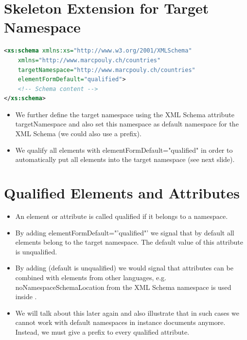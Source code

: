 \section{Skeleton Extension for Target Namespace}
\begin{lstlisting}[language=XML, caption={Skeleton Extension for Target Namespace}]
<xs:schema xmlns:xs="http://www.w3.org/2001/XMLSchema"
	xmlns="http://www.marcpouly.ch/countries"
	targetNamespace="http://www.marcpouly.ch/countries" 
	elementFormDefault="qualified">
	<!-- Schema content --> 
</xs:schema>
\end{lstlisting}
\begin{itemize}
\item We further define the target namespace using the XML Schema attribute targetNamespace and also set this namespace as default
namespace for the XML Schema (we could also use a prefix).
\item We qualify all elements with elementFormDefault="qualified" in order to automatically put all elements into the target namespace (see next slide).
\end{itemize}

\section{Qualified Elements and Attributes}
\begin{itemize}
\item An element or attribute is called qualified if it belongs to a namespace.
\item By adding elementFormDefault="'qualified"' we signal that by default
all elements belong to the target namespace. The default value of this attribute is unqualified.
\item By adding  (default is unqualified) we would signal that attributes can be combined with elements from other languages, e.g. noNamespaceSchemaLocation from the XML Schema namespace is used inside .
\item We will talk about this later again and also illustrate that in such cases we cannot work with default namespaces in instance documents anymore. Instead, we must give a prefix to every qualified attribute.
\end{itemize}

